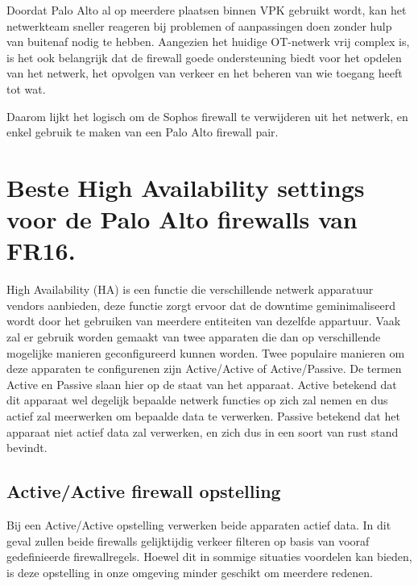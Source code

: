 Doordat Palo Alto al op meerdere plaatsen binnen VPK gebruikt wordt, kan het netwerkteam sneller reageren bij problemen of aanpassingen doen zonder hulp van buitenaf nodig te hebben. Aangezien het huidige OT-netwerk vrij complex is, is het ook belangrijk dat de firewall goede ondersteuning biedt voor het opdelen van het netwerk, het opvolgen van verkeer en het beheren van wie toegang heeft tot wat.

Daarom lijkt het logisch om de Sophos firewall te verwijderen uit het netwerk, en enkel gebruik te maken van een Palo Alto firewall pair.

\newpage

\section{Beste High Availability settings voor de Palo Alto firewalls van FR16.}


High Availability (HA) is een functie die verschillende netwerk apparatuur vendors aanbieden, deze functie zorgt ervoor dat de downtime geminimaliseerd wordt door het gebruiken van meerdere entiteiten van dezelfde appartuur. Vaak zal er gebruik worden gemaakt van twee apparaten die dan op verschillende mogelijke manieren geconfigureerd kunnen worden. Twee populaire manieren om deze apparaten te configurenen zijn Active/Active of Active/Passive. De termen Active en Passive slaan hier op de staat van het apparaat. Active betekend dat dit apparaat wel degelijk bepaalde netwerk functies op zich zal nemen en dus actief zal meerwerken om bepaalde data te verwerken. Passive betekend dat het apparaat niet actief data zal verwerken, en zich dus in een soort van rust stand bevindt.

\subsection{Active/Active firewall opstelling}
Bij een Active/Active opstelling verwerken beide apparaten actief data. In dit geval zullen beide firewalls gelijktijdig verkeer filteren op basis van vooraf gedefinieerde firewallregels. Hoewel dit in sommige situaties voordelen kan bieden, is deze opstelling in onze omgeving minder geschikt om meerdere redenen.
\newline



